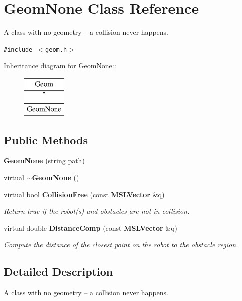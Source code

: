 \section{Geom\-None  Class Reference}
\label{class_GeomNone}
A class with no geometry -- a collision never happens. 


{\tt \#include $<$geom.h$>$}

Inheritance diagram for Geom\-None::\begin{figure}[H]
\begin{center}
\leavevmode
\includegraphics[height=2cm]{class_GeomNone}
\end{center}
\end{figure}
\subsection*{Public Methods}
\begin{CompactItemize}
\item 
{\bf Geom\-None} (string path)
\item 
virtual {\bf $\sim$Geom\-None} ()
\item 
virtual bool {\bf Collision\-Free} (const {\bf MSLVector} \&q)
\begin{CompactList}\small\item\em Return true if the robot(s) and obstacles are not in collision.\item\end{CompactList}\item 
virtual double {\bf Distance\-Comp} (const {\bf MSLVector} \&q)
\begin{CompactList}\small\item\em Compute the distance of the closest point on the robot to the obstacle region.\item\end{CompactList}\end{CompactItemize}


\subsection{Detailed Description}
A class with no geometry -- a collision never happens.



